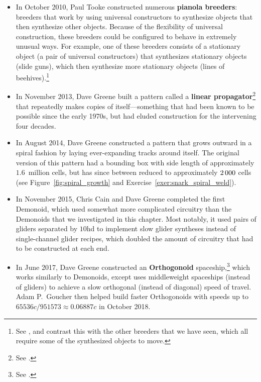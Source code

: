 \begin{itemize}
	\item In October 2010, Paul Tooke constructed numerous \textbf{pianola breeders}: breeders that work by using universal constructors to synthesize objects that then synthesize other objects. Because of the flexibility of universal construction, these breeders could be configured to behave in extremely unusual ways. For example, one of these breeders consists of a stationary object (a pair of universal constructors) that synthesizes stationary objects (slide guns), which then synthesize more stationary objects (lines of beehives).\footnote{See , and contrast this with the other breeders that we have seen, which all require some of the synthesized objects to move.}\smallskip
	
	\item In November 2013, Dave Greene built a pattern called a \textbf{linear propagator}\footnote{See .} that repeatedly makes copies of itself---something that had been known to be possible since the early 1970s, but had eluded construction for the intervening four decades.\smallskip
	
	\item In August 2014, Dave Greene constructed a pattern that grows outward in a spiral fashion by laying ever-expanding tracks around itself. The original version of this pattern had a bounding box with side length of approximately $1.6$~million cells, but has since between reduced to approximately $2{\,}000$ cells (see Figure~\ref{fig:spiral_growth} and Exercise~\ref{exer:snark_spiral_weld}).\smallskip
	
	\item In November 2015, Chris Cain and Dave Greene completed the first Demonoid, which used somewhat more complicated circuitry than the Demonoids that we investigated in this chapter. Most notably, it used pairs of gliders separated by $10$hd to implement slow glider syntheses instead of single-channel glider recipes, which doubled the amount of circuitry that had to be constructed at each end.\smallskip
	
	\item In June 2017, Dave Greene constructed an \textbf{Orthogonoid} spaceship,\footnote{See .} which works similarly to Demonoids, except uses middleweight spaceships (instead of gliders) to achieve a slow orthogonal (instead of diagonal) speed of travel. Adam P.~Goucher then helped build faster Orthogonoids with speeds up to $65536c/951573 \approx 0.06887c$ in October 2018.\smallskip
	

\end{itemize}
